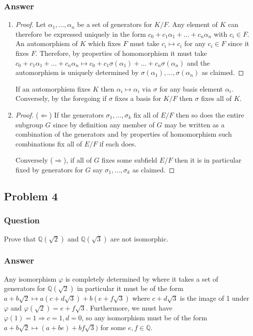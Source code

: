 \documentclass[10pt]{article}
\begin{document}
\subsubsection{Answer}
\begin{enumerate}
\item \begin{proof}Let $\alpha_1, \dots, \alpha_n$ be a set of generators for $K/F$. Any element of $K$ can therefore be expressed uniquely in the form $c_0 + c_1\alpha_1 + \dots + c_n \alpha_n$ with $c_i \in F$. An automorphism of $K$ which fixes $F$ must take $c_i \mapsto c_i$ for any $c_i \in F$ since it fixes $F$. Therefore, by properties of homomorphism it must take $c_0 + c_1\alpha_1 + \dots + c_n \alpha_n \mapsto c_0 + c_1 \sigma(\alpha_1) + \dots + c_n \sigma(\alpha_n)$ and the automorphism is uniquely determined by $\sigma(\alpha_1), \dots, \sigma(\alpha_n)$ as claimed.\end{proof}

If an automorphism fixes $K$ then $\alpha_i \mapsto \alpha_i$ via $\sigma$ for any basis element $\alpha_i$. Conversely, by the foregoing if $\sigma$ fixes a basis for $K/F$ then $\sigma$ fixes all of $K$.

\item \begin{proof} ($\Leftarrow$) If the generators $\sigma_1, \dots, \sigma_k$ fix all of $E/F$ then so does the entire subgroup $G$ since by definition any member of $G$ may be written as a combination of the generators and by properties of homomorphism such combinations fix all of $E/F$ if each does.

Conversely ($\Rightarrow$), if all of $G$ fixes some subfield $E/F$ then it is in particular fixed by generators for $G$ say $\sigma_1, \dots ,  \sigma_k$ as claimed.\end{proof}
\end{enumerate}

\subsection{Problem 4}
\subsubsection{Question}
Prove that $\mathbb{Q}(\sqrt 2)$ and $\mathbb{Q} (\sqrt{3})$ are not isomorphic.
\subsubsection{Answer}
Any isomorphism $\varphi$ is completely determined by where it takes a set of generators for $\mathbb{Q}(\sqrt2)$ in particular it must be of the form $a + b \sqrt 2 \mapsto a(c + d \sqrt3)+ b (e + f \sqrt3)$ where $c+d \sqrt 3$ is the image of 1 under $\varphi$ and $\varphi(\sqrt2)=e+f \sqrt3$. Furthermore, we must have $\varphi(1) =1 \Rightarrow c=1, d=0$, so any isomorphism must be of the form $a+ b \sqrt2 \mapsto (a+be)+bf\sqrt3)$ for some $e,f \in \mathbb{Q}$. 
\end{document}
